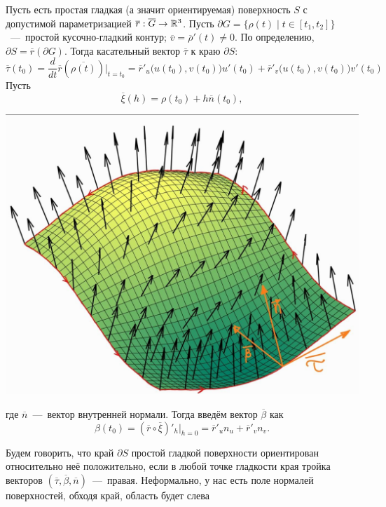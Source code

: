 \noindent 
\begin{minipage}{0.6\textwidth}
\begin{definition}
    Пусть есть простая гладкая (а значит ориентируемая) поверхность $S$ с допустимой параметризацией $\overline{r}: \overline{G} \rightarrow \mathbb{R}^3$. Пусть $\partial  G = \{\rho(t) \mid t \in [t_1, t_2]\}$~---~простой кусочно-гладкий контур; $\overline{v} = \overline{\rho}'(t) \neq 0$. По определению, $\partial  S = \overline{r}(\partial G)$. Тогда касательный вектор $\overline{\tau}$ к краю $\partial S$: \[\overline{\tau}(t_0) = \dfrac{d}{dt}\overline{r}(\overline{\rho(t)})|_{t = t_0} = \overline{r}'_u \Big(u(t_0), v(t_0)\Big)u'(t_0) + \overline{r}'_v \Big(u(t_0), v(t_0) \Big)v'(t_0)\]
    Пусть \[\overline{\xi}(h) = \rho(t_0) + h\overline{n}(t_0),\]
    
\end{definition}
\end{minipage}
\begin{minipage}{0.4\textwidth}
\includegraphics[width=\textwidth]{images/pov_orientation.png}
\end{minipage}
где $\overline{n}$~---~вектор внутренней нормали. Тогда введём вектор $\overline{\beta}$ как \[\beta(t_0) = (\overline{r} \circ \overline{\xi})'_h|_{h = 0} = \overline{r}'_un_u + \overline{r}'_vn_v.\]
\begin{definition}
    Будем говорить, что край $\partial S$ простой гладкой поверхности ориентирован относительно неё положительно, если в любой точке гладкости края тройка векторов $(\overline{\tau}, \overline{\beta}, \overline{n})$~---~правая. Неформально, у нас есть поле нормалей поверхностей, обходя край, область будет слева

\end{definition}
    
